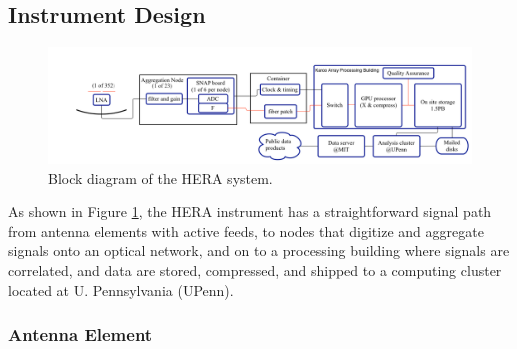 \documentclass[preprint]{aastex}
\newcommand{\compress}{\vspace{-0.25in}}
\newcommand{\Caption}[4]{\vspace{#1}\renewcommand{\baselinestretch}{#2}\caption{#4}\vspace{#3}}
\begin{document}
\compress
\subsection{Instrument Design}
\label{InstDes}
%
%

\begin{figure}[t]
\centering
\includegraphics[width=\textwidth]{plots/Engineering/HERA_high_level_block_diagram.png}
\Caption{-0.75in}{0.99}{0in}{\small
Block diagram of the HERA system.}
\label{fig:blockDiagram} 
\end{figure}

As shown in Figure \ref{fig:blockDiagram}, the HERA instrument has a straightforward signal
path from antenna elements
with active feeds, to nodes that digitize and aggregate signals onto an optical network,
and on to a processing building where signals are correlated, and data are stored, compressed,
and shipped to a computing cluster located at U. Pennsylvania (UPenn). 

\compress
\subsubsection{Antenna Element}
\end{document}
